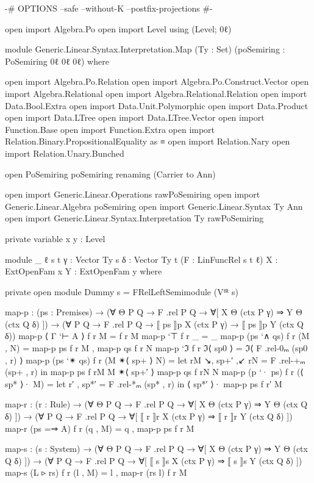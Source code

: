 \begin{code}
{-# OPTIONS --safe --without-K --postfix-projections #-}

open import Algebra.Po
open import Level using (Level; 0ℓ)

module Generic.Linear.Syntax.Interpretation.Map
  (Ty : Set) (poSemiring : PoSemiring 0ℓ 0ℓ 0ℓ)
  where

  open import Algebra.Po.Relation
  open import Algebra.Po.Construct.Vector
  open import Algebra.Relational
  open import Algebra.Relational.Relation
  open import Data.Bool.Extra
  open import Data.Unit.Polymorphic
  open import Data.Product
  open import Data.LTree
  open import Data.LTree.Vector
  open import Function.Base
  open import Function.Extra
  open import Relation.Binary.PropositionalEquality as ≡
  open import Relation.Nary
  open import Relation.Unary.Bunched

  open PoSemiring poSemiring renaming (Carrier to Ann)

  open import Generic.Linear.Operations rawPoSemiring
  open import Generic.Linear.Algebra poSemiring
  open import Generic.Linear.Syntax Ty Ann
  open import Generic.Linear.Syntax.Interpretation Ty rawPoSemiring

  private
    variable
      x y : Level

  module _ {ℓ s t} {γ : Vector Ty s} {δ : Vector Ty t}
           (F : LinFuncRel s t ℓ) {X : ExtOpenFam x} {Y : ExtOpenFam y}
    where

    private open module Dummy {s} = FRelLeftSemimodule (Vᶠᴿ s)

    map-p : (ps : Premises) →
      (∀ {Θ P Q} → F .rel P Q → ∀[ X Θ (ctx P γ) ⇒ Y Θ (ctx Q δ) ]) →
      (∀ {P Q} → F .rel P Q → ⟦ ps ⟧p X (ctx P γ) → ⟦ ps ⟧p Y (ctx Q δ))
    map-p ⟨ Γ `⊢ A ⟩ f r M = f r M
    map-p `⊤ f r _ = _
    map-p (ps `∧ qs) f r (M , N) = map-p ps f r M , map-p qs f r N
    map-p `ℑ f r ℑ⟨ sp0 ⟩ = ℑ⟨ F .rel-0ₘ (sp0 , r) ⟩
    map-p (ps `✴ qs) f r (M ✴⟨ sp+ ⟩ N) =
      let rM ↘, sp+′ ,↙ rN = F .rel-+ₘ (sp+ , r) in
      map-p ps f rM M ✴⟨ sp+′ ⟩ map-p qs f rN N
    map-p (p `· ps) f r (⟨ sp* ⟩· M) =
      let r′ , sp*′ = F .rel-*ₘ (sp* , r) in
      ⟨ sp*′ ⟩· map-p ps f r′ M

    map-r : (r : Rule) →
      (∀ {Θ P Q} → F .rel P Q → ∀[ X Θ (ctx P γ) ⇒ Y Θ (ctx Q δ) ]) →
      (∀ {P Q} → F .rel P Q → ∀[ ⟦ r ⟧r X (ctx P γ) ⇒ ⟦ r ⟧r Y (ctx Q δ) ])
    map-r (ps =⇒ A) f r (q , M) = q , map-p ps f r M

    map-s : (s : System) →
      (∀ {Θ P Q} → F .rel P Q → ∀[ X Θ (ctx P γ) ⇒ Y Θ (ctx Q δ) ]) →
      (∀ {P Q} → F .rel P Q → ∀[ ⟦ s ⟧s X (ctx P γ) ⇒ ⟦ s ⟧s Y (ctx Q δ) ])
    map-s (L ▹ rs) f r (l , M) = l , map-r (rs l) f r M


\end{code}
